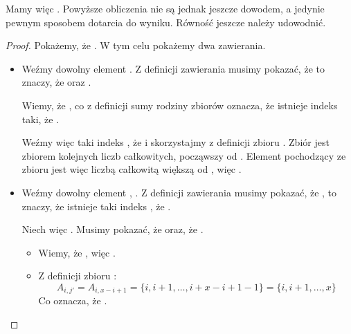 \begin{example}
\begin{enumerate}
    Mamy więc . Powyższe obliczenia nie są jednak jeszcze dowodem, a jedynie pewnym sposobem dotarcia do wyniku. Równość jeszcze należy udowodnić.
    
    \begin{proof}
    Pokażemy, że . W tym celu pokażemy dwa zawierania.
    \begin{itemize}
        \item {}
        
        Weźmy dowolny element . Z definicji zawierania musimy pokazać, że  to znaczy, że  oraz .
        
        Wiemy, że , co z definicji sumy rodziny zbiorów oznacza, że istnieje indeks  taki, że . 
        
        Weźmy więc taki indeks , że  i skorzystajmy z definicji zbioru . Zbiór  jest zbiorem  kolejnych liczb całkowitych, począwszy od . Element  pochodzący ze zbioru  jest więc liczbą całkowitą większą od , więc .
        
        \item {}
        
        Weźmy dowolny element , . Z definicji zawierania musimy pokazać, że , to znaczy, że istnieje taki indeks , że .
        
        Niech więc . Musimy pokazać, że  oraz, że .
        
        \begin{itemize}
            \item Wiemy, że , więc .
            \item Z definicji zbioru :
            \[
                A_{i,j'} = A_{i,x-i+1} = \{ i, i+1, \dots, i+x-i+1-1 \} = \{ i, i+1, \dots, x \}
            \]
            Co oznacza, że .
        \end{itemize}
    \end{itemize}
    \end{proof}
    

\end{enumerate}
\end{example}
